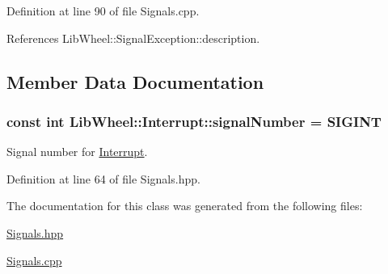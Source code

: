 \-Definition at line 90 of file \-Signals.\-cpp.



\-References \-Lib\-Wheel\-::\-Signal\-Exception\-::description.



\subsection{\-Member \-Data \-Documentation}
\hypertarget{classLibWheel_1_1Interrupt_a73b379bb2504c68644a132100bc43c38}{
\subsubsection[{signal\-Number}]{\setlength{\rightskip}{0pt plus 5cm}const int {\bf \-Lib\-Wheel\-::\-Interrupt\-::signal\-Number} = \-S\-I\-G\-I\-N\-T}}
\label{classLibWheel_1_1Interrupt_a73b379bb2504c68644a132100bc43c38}


\-Signal number for \hyperlink{classLibWheel_1_1Interrupt}{\-Interrupt}. 



\-Definition at line 64 of file \-Signals.\-hpp.



\-The documentation for this class was generated from the following files\-:\begin{DoxyCompactItemize}
\item 
\hyperlink{Signals_8hpp}{\-Signals.\-hpp}\item 
\hyperlink{Signals_8cpp}{\-Signals.\-cpp}\end{DoxyCompactItemize}
